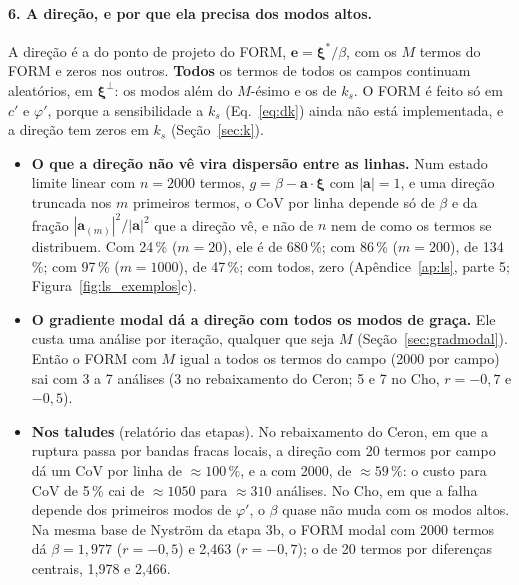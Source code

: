 \documentclass[11pt,a4paper]{article}
\newcommand{\xib}{\bm\xi}
\begin{document}
\paragraph{6. A direção, e por que ela precisa dos modos altos.} A direção é a do ponto de projeto do FORM,
$\bm e = \xib^*/\beta$, com os $M$ termos do FORM e zeros nos outros. \textbf{Todos} os termos de todos os campos continuam
aleatórios, em $\xib^\perp$: os modos além do $M$-ésimo e os de $k_s$. O FORM é feito só em $c'$ e $\varphi'$, porque a
sensibilidade a $k_s$ (Eq.~\ref{eq:dk}) ainda não está implementada, e a direção tem zeros em $k_s$
(Seção~\ref{sec:k}).
\begin{itemize}
  \item \textbf{O que a direção não vê vira dispersão entre as linhas.} Num estado limite linear com $n = 2000$
    termos, $g = \beta - \bm a\cdot\xib$ com $|\bm a| = 1$, e uma direção truncada nos $m$ primeiros termos, o CoV por linha
    depende só de $\beta$ e da fração $|\bm a_{(m)}|^2/|\bm a|^2$ que a direção vê, e não de $n$ nem de como os termos se
    distribuem. Com 24\,\% ($m = 20$), ele é de 680\,\%; com 86\,\%
    ($m = 200$), de 134\,\%; com 97\,\% ($m = 1000$), de 47\,\%; com todos, zero (Apêndice~\ref{ap:ls}, parte 5;
    Figura~\ref{fig:ls_exemplos}c).
  \item \textbf{O gradiente modal dá a direção com todos os modos de graça.} Ele custa uma análise por iteração,
    qualquer que seja $M$ (Seção~\ref{sec:gradmodal}). Então o FORM com $M$ igual a todos os termos do campo (2000 por
    campo) sai com 3 a 7 análises (3 no rebaixamento do Ceron; 5 e 7 no Cho, $r = -0{,}7$ e
    $-0{,}5$).
  \item \textbf{Nos taludes} (relatório das etapas). No rebaixamento do Ceron, em que a ruptura passa por bandas fracas
    locais, a direção com 20 termos por campo dá um CoV por linha de $\approx 100\,\%$, e a com 2000, de
    $\approx 59\,\%$: o custo para CoV de 5\,\% cai de $\approx 1050$ para $\approx 310$ análises. No Cho, em que a falha
    depende dos primeiros modos de $\varphi'$, o $\beta$ quase não muda com os modos altos. Na mesma base de Nyström da
    etapa 3b, o FORM modal com 2000 termos dá $\beta = 1{,}977$ ($r = -0{,}5$) e 2,463 ($r = -0{,}7$); o de 20 termos
    por diferenças centrais, 1,978 e 2,466.
\end{itemize}
\end{document}
